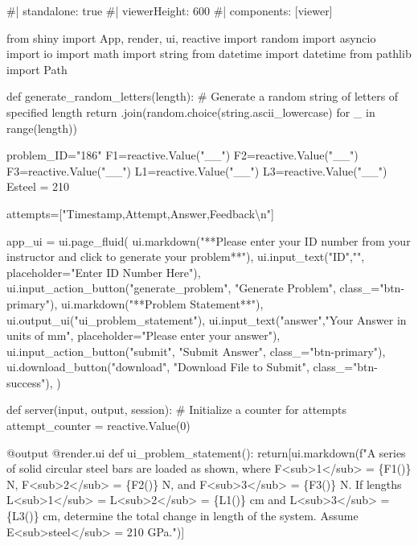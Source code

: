 \documentclass[
  letterpaper,
  DIV=11,
  numbers=noendperiod]{scrreprt}
\newenvironment{Shaded}{\begin{snugshade}}{\end{snugshade}}
\newcommand{\NormalTok}[1]{\textcolor[rgb]{0.00,0.23,0.31}{#1}}
\begin{document}
\begin{Shaded}
\begin{Highlighting}[]
\NormalTok{\#| standalone: true}
\NormalTok{\#| viewerHeight: 600}
\NormalTok{\#| components: [viewer]}

\NormalTok{from shiny import App, render, ui, reactive}
\NormalTok{import random}
\NormalTok{import asyncio}
\NormalTok{import io}
\NormalTok{import math}
\NormalTok{import string}
\NormalTok{from datetime import datetime}
\NormalTok{from pathlib import Path}

\NormalTok{def generate\_random\_letters(length):}
\NormalTok{    \# Generate a random string of letters of specified length}
\NormalTok{    return \textquotesingle{}\textquotesingle{}.join(random.choice(string.ascii\_lowercase) for \_ in range(length))}

\NormalTok{problem\_ID="186"}
\NormalTok{F1=reactive.Value("\_\_")}
\NormalTok{F2=reactive.Value("\_\_")}
\NormalTok{F3=reactive.Value("\_\_")}
\NormalTok{L1=reactive.Value("\_\_")}
\NormalTok{L3=reactive.Value("\_\_")}
\NormalTok{Esteel = 210}


\NormalTok{attempts=["Timestamp,Attempt,Answer,Feedback\textbackslash{}n"]}

\NormalTok{app\_ui = ui.page\_fluid(}
\NormalTok{    ui.markdown("**Please enter your ID number from your instructor and click to generate your problem**"),}
\NormalTok{    ui.input\_text("ID","", placeholder="Enter ID Number Here"),}
\NormalTok{    ui.input\_action\_button("generate\_problem", "Generate Problem", class\_="btn{-}primary"),}
\NormalTok{    ui.markdown("**Problem Statement**"),}
\NormalTok{    ui.output\_ui("ui\_problem\_statement"),}
\NormalTok{    ui.input\_text("answer","Your Answer in units of mm", placeholder="Please enter your answer"),}
\NormalTok{    ui.input\_action\_button("submit", "Submit Answer", class\_="btn{-}primary"),}
\NormalTok{    ui.download\_button("download", "Download File to Submit", class\_="btn{-}success"),}
\NormalTok{)}


\NormalTok{def server(input, output, session):}
\NormalTok{    \# Initialize a counter for attempts}
\NormalTok{    attempt\_counter = reactive.Value(0)}

\NormalTok{    @output}
\NormalTok{    @render.ui}
\NormalTok{    def ui\_problem\_statement():}
\NormalTok{        return[ui.markdown(f"A series of solid circular steel bars are loaded as shown, where F\textless{}sub\textgreater{}1\textless{}/sub\textgreater{} = \{F1()\} N, F\textless{}sub\textgreater{}2\textless{}/sub\textgreater{} = \{F2()\} N, and F\textless{}sub\textgreater{}3\textless{}/sub\textgreater{} = \{F3()\} N. If lengths L\textless{}sub\textgreater{}1\textless{}/sub\textgreater{} = L\textless{}sub\textgreater{}2\textless{}/sub\textgreater{} = \{L1()\} cm and L\textless{}sub\textgreater{}3\textless{}/sub\textgreater{} = \{L3()\} cm, determine the total change in length of the system. Assume E\textless{}sub\textgreater{}steel\textless{}/sub\textgreater{} = 210 GPa.")]}
    

\end{Highlighting}
\end{Shaded}
\end{document}

